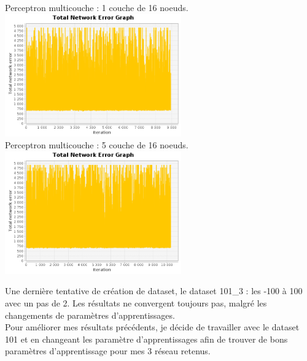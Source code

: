 \documentclass[10pt]{report}
\begin{document}
\begin{center}
Perceptron multicouche : 1 couche de 16 noeuds.\\
\includegraphics[height=200px]{img/SQUARE_16_101_2.png}\\
Perceptron multicouche : 5 couche de 16 noeuds.\\
\includegraphics[height=200px]{img/SQUARE_16_16_16_16_16_101_2.png}\\
\end{center}

Une dernière tentative de création de dataset, le dataset 101\_3 : les -100 à 100 avec un pas de 2. Les résultats ne convergent toujours pas, malgré les changements de paramètres d'apprentissages.\\

Pour améliorer mes résultats précédents, je décide de travailler avec le dataset 101 et en changeant les paramètre d'apprentissages afin de trouver de bons paramètres d'apprentissage pour mes 3 réseau retenus.
\end{document}
